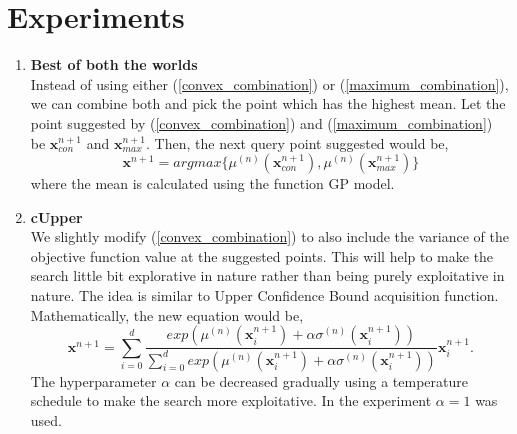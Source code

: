 \documentclass{article}
\begin{document}
\section{Experiments}
    \begin{enumerate}
        \item
            \textbf {Best of both the worlds} \\
            Instead of using either (\ref{convex_combination}) or (\ref{maximum_combination}), we can combine both and pick the point which has the highest
            mean. Let the point suggested by (\ref{convex_combination}) and (\ref{maximum_combination}) be $\textbf{x}^{n+1}_{con}$ and 
            $\textbf{x}^{n+1}_{max}$. Then, the next query point suggested would be,
            \begin{equation}
                \textbf{x}^{n+1} = arg max \{\mu^{(n)}(\textbf{x}^{n+1}_{con}), \mu^{(n)}(\textbf{x}^{n+1}_{max})\}
            \end{equation}
            where the mean is calculated using the function GP model.

        \item
            \textbf {cUpper} \\
            We slightly modify (\ref{convex_combination}) to also include the variance of the objective function value at the suggested points. This will help
            to make the search little bit explorative in nature rather than being purely exploitative in nature. The idea is similar to Upper Confidence Bound 
            acquisition function. Mathematically, the new equation would be,
            \begin{equation}
                \textbf {x}^{n+1} = \sum_{i=0}^{d} \frac {exp(\mu^{(n)}(\textbf{x}^{n+1}_{i})+\alpha\sigma^{(n)}(\textbf{x}^{n+1}_{i}) )}{\sum_{i=0}^{d} exp(\mu^{(n)}(\textbf{x}^{n+1}_{i})+\alpha\sigma^{(n)}(\textbf{x}^{n+1}_{i}))} \textbf{x}^{n+1}_{i}.
                \label{cUpper_combination}
            \end{equation}
            The hyperparameter $\alpha$ can be decreased gradually using a temperature schedule to make the search more exploitative. In the experiment
            $\alpha=1$ was used.


\end{enumerate}
\end{document}
